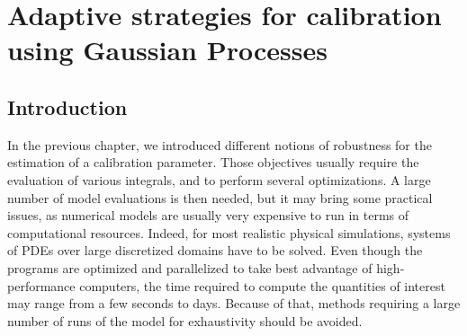 \documentclass[../../Main_ManuscritThese.tex]{subfiles}
\begin{document}
\chapter{Adaptive strategies for calibration using Gaussian Processes}
\label{chap:adaptative_design_gp}
\minitoc
\newpage
\subfileLocal{\pagestyle{contentStyle}}



\section{Introduction}

In the previous chapter, we introduced different notions of robustness
for the estimation of a calibration parameter. Those objectives
usually require the evaluation of various integrals, and to perform
several optimizations. A large number of model evaluations is then
needed, but it may bring some practical issues, as numerical models
are usually very expensive to run in terms of computational
resources. Indeed, for most realistic physical simulations, systems of
PDEs over large discretized domains have to be solved. Even though the
programs are optimized and parallelized to take best advantage of
high-performance computers, the time required to compute the
quantities of interest may range from a few seconds to days. Because
of that, methods requiring a large number of runs of the model for
exhaustivity should be avoided.


\end{document}
